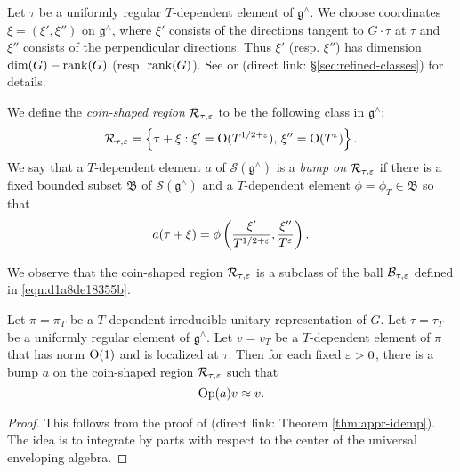 \documentclass[reqno]{amsart} 
\numberwithin{equation}{section}
\begin{document}
\begin{definition}
  Let $\tau$ be a uniformly regular $T$-dependent element of $\mathfrak{g}^\wedge$.  We choose coordinates $\xi = (\xi ', \xi '')$ on $\mathfrak{g}^\wedge$, where $\xi '$ consists of the directions tangent to $G \cdot \tau$ at $\tau$ and $\xi ''$ consists of the perpendicular directions.  Thus $\xi'$ (resp. $\xi ''$) has dimension $\dim(G) - \operatorname{rank}(G)$ (resp. $\operatorname{rank}(G)$).  See \cite[\S9.4.1]{2020arXiv201202187N} or \cite[\S13.3.4]{2021arXiv210915230N} (direct link: \S\ref{sec:refined-classes}) for details.

  We define the \emph{coin-shaped region} $\mathcal{R} _{\tau,\varepsilon}$ to be the following class in $\mathfrak{g}^\wedge$:
  \begin{equation*}
\mathcal{R}_{\tau,\varepsilon} = \left\{ \tau + \xi : \xi ' = \operatorname{O}(T^{1/2+\varepsilon}), \, \xi '' = \operatorname{O}(T^{\varepsilon}) \right\}.
\end{equation*}
We say that a $T$-dependent element $a$ of $\mathcal{S}(\mathfrak{g}^\wedge)$ is a \emph{bump on} $\mathcal{R}_{\tau,\varepsilon}$ if there is a fixed bounded subset $\mathfrak{B}$ of $\mathcal{S}(\mathfrak{g}^\wedge)$ and a $T$-dependent element $\phi = \phi_T \in \mathfrak{B}$ so that
\begin{equation*}
a(\tau + \xi ) = \phi\left(\frac{\xi ' }{ T^{1/2+\varepsilon}}, \frac{\xi '' }{ T^\varepsilon}\right).
\end{equation*}
\end{definition}
We observe that the coin-shaped region $\mathcal{R}_{\tau,\varepsilon}$ is a subclass of the ball $\mathcal{B}_{\tau,\varepsilon}$ defined in \eqref{eqn:d1a8de18355b}.

\begin{theorem}
  Let $\pi = \pi_T$ be a $T$-dependent irreducible unitary representation of $G$.  Let $\tau = \tau_T$ be a uniformly regular element of $\mathfrak{g}^\wedge$.  Let $v = v_T$ be a $T$-dependent element of $\pi$ that has norm $\operatorname{O}(1)$ and is localized at $\tau$.  Then for each fixed $\varepsilon > 0$, there is a bump $a$ on the coin-shaped region $\mathcal{R}_{\tau,\varepsilon}$ such that
  \begin{equation*}
    \operatorname{Op}(a) v \approx v.
  \end{equation*}
\end{theorem}
\begin{proof}
This follows from the proof of \cite[Thm 17.12]{2021arXiv210915230N} (direct link: Theorem \ref{thm:appr-idemp}).  The idea is to integrate by parts with respect to the center of the universal enveloping algebra.
\end{proof}
\end{document}
